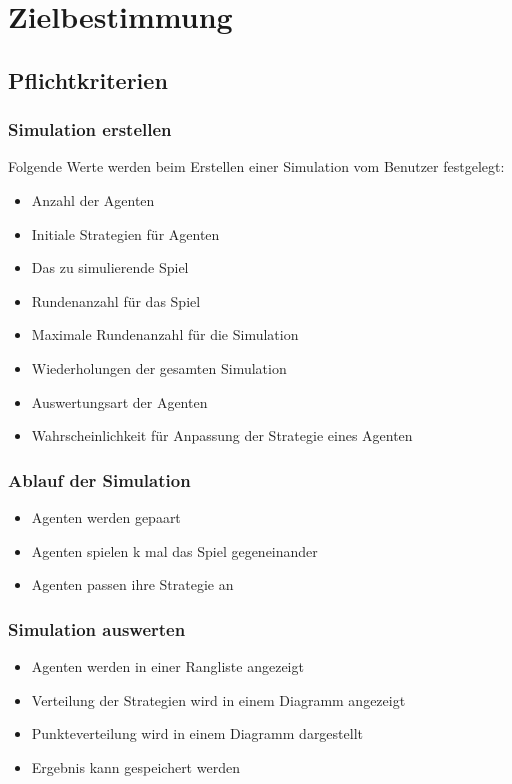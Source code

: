 \section{Zielbestimmung}

\subsection{Pflichtkriterien}

\subsubsection{Simulation erstellen}
Folgende Werte werden beim Erstellen einer Simulation vom Benutzer festgelegt:
\begin{itemize}
\item Anzahl der Agenten 
\item Initiale Strategien für Agenten
\item Das zu simulierende Spiel
\item Rundenanzahl für das Spiel
\item Maximale Rundenanzahl für die Simulation
\item Wiederholungen der gesamten Simulation
\item Auswertungsart der Agenten
\item Wahrscheinlichkeit für Anpassung der Strategie eines Agenten
\end{itemize}

\subsubsection{Ablauf der Simulation}
\begin{itemize}
\item Agenten werden gepaart
\item Agenten spielen k mal das Spiel gegeneinander
\item Agenten passen ihre Strategie an
\end{itemize}

\subsubsection{Simulation auswerten}
\begin{itemize}
\item Agenten werden in einer Rangliste angezeigt
\item Verteilung der Strategien wird in einem Diagramm angezeigt
\item Punkteverteilung wird in einem Diagramm dargestellt
\item Ergebnis kann gespeichert werden
\end{itemize}


